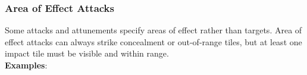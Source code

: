 \documentclass[12pt]{article}
\begin{document}
\begin{multicols*}{2}
\vspace*{\fill}
\columnbreak

\subsubsection{Area of Effect Attacks}
Some attacks and attunements specify areas of effect rather than targets. Area of effect attacks can always strike concealment or out-of-range tiles, but at least one impact tile must be visible and within range.\\

\textbf{Examples}:
\begin{center}
\framebox{
}
\end{center}
\end{multicols*}
\end{document}
